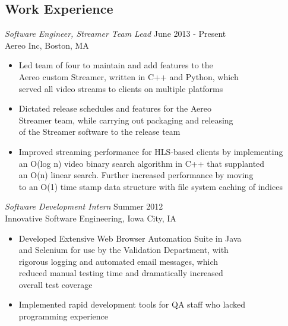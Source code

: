 \documentclass[line,margin]{res}
\begin{document}
\address{197 Summer St, Apt 2, Somerville MA, 02143}
\address{(563) 581-8229}

    \begin{resume}
        \section{Work Experience}
            {\sl Software Engineer, Streamer Team Lead} \hfill June 2013 - Present \\ %
            Aereo Inc, Boston, MA
                \begin{itemize} \itemsep -2pt %
                    \item Led team of four to maintain and add features to the \\
                          Aereo custom Streamer, written in C++ and Python, which \\
                          served all video streams to clients on multiple platforms
                    \item Dictated release schedules and features for the Aereo \\
                          Streamer team, while carrying out packaging and releasing \\
                          of the Streamer software to the release team
                    \item Improved streaming performance for HLS-based clients by implementing \\
                          an O(log n) video binary search algorithm in C++ that supplanted \\
                          an O(n) linear search. Further increased performance by moving \\
                          to an O(1) time stamp data structure with file system caching of indices
                \end{itemize}

            {\sl Software Development Intern} \hfill Summer 2012 \\
            Innovative Software Engineering, Iowa City, IA
                \begin{itemize} \itemsep -2pt %
                    \item Developed Extensive Web Browser Automation Suite in Java \\
                          and Selenium for use by the Validation Department, with \\
                          rigorous logging and automated email messages, which \\
                          reduced manual testing time and dramatically increased \\
                          overall test coverage
                    \item Implemented rapid development tools for QA staff who lacked \\ 
                          programming experience 
                \end{itemize}


\end{resume}
\end{document}
